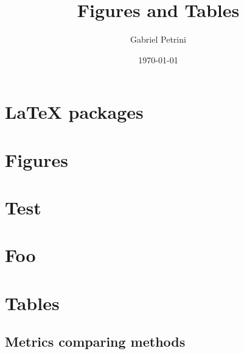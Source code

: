 \documentclass[11pt]{article}
\author{Gabriel Petrini}
\date{\today}
\title{Figures and Tables}
\begin{document}
\maketitle
\tableofcontents

\section{\LaTeX{} packages}
\label{sec:org2441d27}
\section{Figures}
\label{sec:org5ea8224}

\section*{Test}
\section*{Foo}
\section{Tables}
\label{sec:orgcf57b2c}

\subsection{Metrics comparing methods}
\label{sec:org42b4e4f}


\end{document}
